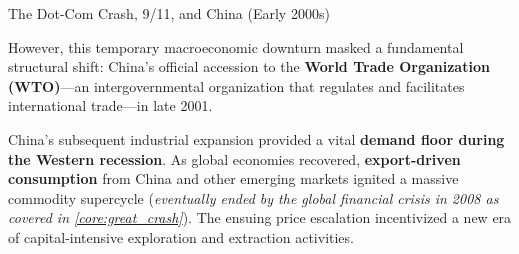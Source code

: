 \documentclass[10pt]{article}
\begin{document}
      \begin{core}{The Dot-Com Crash, 9/11, and China (Early 2000s)}


        However, this temporary macroeconomic downturn masked a fundamental structural shift: China's official accession to the \textbf{World Trade Organization (WTO)}---an intergovernmental organization that regulates and facilitates international trade---in late 2001.


        China's subsequent industrial expansion provided a vital \textbf{demand floor during the Western recession}. As global economies recovered, \textbf{export-driven consumption} from China and other emerging markets ignited a massive commodity supercycle (\textit{eventually ended by the global financial crisis in 2008 as covered in \autoref{core:great_crash}}). The ensuing price escalation incentivized a new era of capital-intensive exploration and extraction activities.

      \end{core}
\end{document}
